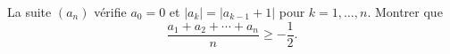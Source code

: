 La suite $(a_n)$ vérifie $a_0 = 0$ et $|a_k| = |a_{k-1} + 1|$ pour $k = 1, \ldots, n$. Montrer que
\[ \frac{a_1 + a_2 + \cdots + a_n}{n} \geq -\frac{1}{2}. \]
